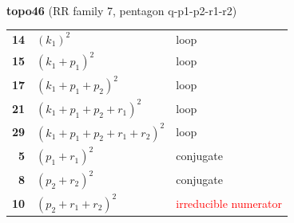 \documentclass[10pt]{article}
\begin{document}
\begin{minipage}[t]{0.48\textwidth}
{}\\[2mm]\textbf{topo46} (RR family 7, pentagon q-p1-p2-r1-r2)\\[2pt]{\footnotesize\begin{tabular}{@{}r@{\ \ }l@{\ \ }l@{}}\textbf{14} & $(k_1)^2$ & loop\\
\textbf{15} & $(k_1+p_1)^2$ & loop\\
\textbf{17} & $(k_1+p_1+p_2)^2$ & loop\\
\textbf{21} & $(k_1+p_1+p_2+r_1)^2$ & loop\\
\textbf{29} & $(k_1+p_1+p_2+r_1+r_2)^2$ & loop\\
\textbf{5} & $(p_1+r_1)^2$ & conjugate\\
\textbf{8} & $(p_2+r_2)^2$ & conjugate\\
\textbf{10} & $(p_2+r_1+r_2)^2$ & \textcolor{red}{irreducible numerator}\\\end{tabular}}\end{minipage}

\bigskip
\end{document}
